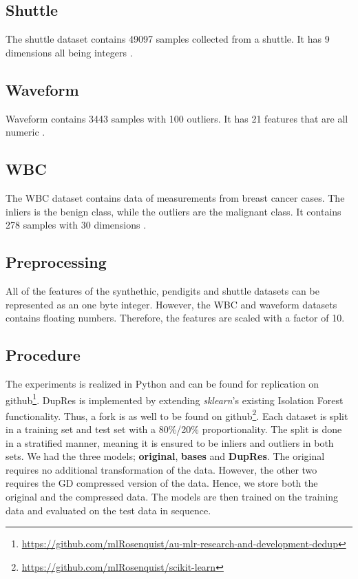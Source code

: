\subsection*{Shuttle}
The shuttle dataset contains 49097 samples collected from a shuttle. It has 9 dimensions all being integers \cite{ODDS}.    

\subsection*{Waveform}
Waveform contains 3443 samples with 100 outliers. It has 21 features that are all numeric \cite{waveform}. 

\subsection*{WBC}
The WBC dataset contains data of measurements from breast cancer cases. The inliers is the benign class, while the outliers are the malignant class. It contains 278 samples with 30 dimensions \cite{ODDS}.   

\subsection{Preprocessing}
All of the features of the synthethic, pendigits and shuttle datasets can be represented as an one byte integer. However, the WBC and waveform datasets contains floating numbers. Therefore, the features are scaled with a factor of 10.

\subsection{Procedure}
The experiments is realized in Python and can be found for replication on github\footnote{\href{https://github.com/mlRosenquist/au-mlr-research-and-development-dedup}{https://github.com/mlRosenquist/au-mlr-research-and-development-dedup}}. DupRes is implemented by extending \textit{sklearn}'s existing Isolation Forest functionality. Thus, a fork is as well to be found on github\footnote{\href{https://github.com/mlRosenquist/scikit-learn}{https://github.com/mlRosenquist/scikit-learn}}. 
Each dataset is split in a training set and test set with a 80\%/20\% proportionality. The split is done in a stratified manner, meaning it is ensured to be inliers and outliers in both sets. We had the three models; \textbf{original}, \textbf{bases} and \textbf{DupRes}. The original requires no additional transformation of the data. However, the other two requires the GD compressed version of the data. Hence, we store both the original and the compressed data. The models are then trained on the training data and evaluated on the test data in sequence.   


